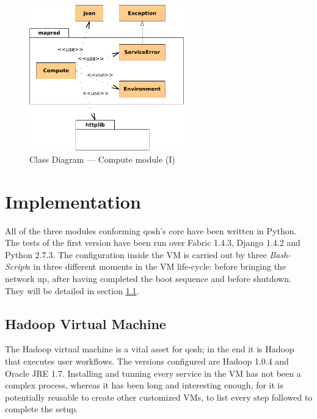 \begin{figure}[tbp]
\begin{center}
\includegraphics[width=0.6\textwidth]{imagenes/027.pdf}
 \caption{Class Diagram --- Compute module (I)}
\label{fig:diagramaclasescompute1}
\end{center}
\end{figure}

\section{Implementation}\label{sec:implementacion}
\noindent All of the three modules conforming qosh's core have been written in Python. The tests of the first version have been run over Fabric 1.4.3, Django 1.4.2 and Python 2.7.3. The configuration inside the VM is carried out by three \emph{Bash-Script}s in three different moments in the VM life-cycle: before bringing the network up, after having completed the boot sequence and before shutdown. They will be detailed in section \ref{subsec:maquinavirtual}.

\subsection{Hadoop Virtual Machine}\label{subsec:maquinavirtual}
\noindent The Hadoop virtual machine is a vital asset for qosh; in the end it is Hadoop that executes user workflows. The versions configured are Hadoop 1.0.4 and Oracle JRE 1.7. Installing and tunning every service in the VM has not been a complex process, whereas it has been long and interesting enough, for it is potentially reusable to create other customized VMs, to list every step followed to complete the setup.

